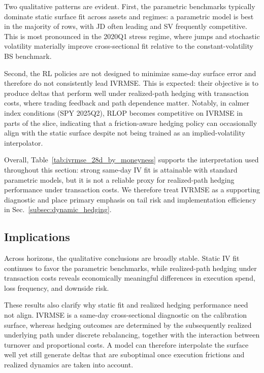 Two qualitative patterns are evident.
First, the parametric benchmarks typically dominate static surface fit across assets and regimes: a parametric model is best in the majority of rows, with JD
often leading and SV frequently competitive.
This is most pronounced in the 2020Q1 stress regime, where jumps and stochastic volatility materially improve cross-sectional fit relative to the constant-volatility
BS benchmark.

Second, the RL policies are not designed to minimize same-day surface error and therefore do not consistently lead IVRMSE.
This is expected: their objective is to produce deltas that perform well under realized-path hedging with transaction costs, where trading feedback and
path dependence matter.
Notably, in calmer index conditions (SPY 2025Q2), RLOP becomes competitive on IVRMSE in parts of the slice, indicating that a friction-aware hedging policy can
occasionally align with the static surface despite not being trained as an implied-volatility interpolator.

Overall, Table~\ref{tab:ivrmse_28d_by_moneyness} supports the interpretation used throughout this section:
strong same-day IV fit is attainable with standard parametric models, but it is not a reliable proxy for realized-path hedging performance under transaction costs.
We therefore treat IVRMSE as a supporting diagnostic and place primary emphasis on tail risk and implementation efficiency in
Sec.~\ref{subsec:dynamic_hedging}.


\subsection{Implications}
\label{subsec:robustness_implications}

Across horizons, the qualitative conclusions are broadly stable. Static IV fit continues to favor the parametric benchmarks, while realized-path hedging under transaction costs reveals economically meaningful differences in execution spend, loss frequency, and downside risk.

These results also clarify why static fit and realized hedging performance need not align. IVRMSE is a same-day cross-sectional diagnostic on the calibration surface, whereas hedging outcomes are determined by the subsequently realized underlying path under discrete rebalancing, together with the interaction between turnover and proportional costs. A model can therefore interpolate the surface well yet still generate deltas that are suboptimal once execution frictions and realized dynamics are taken into account.

